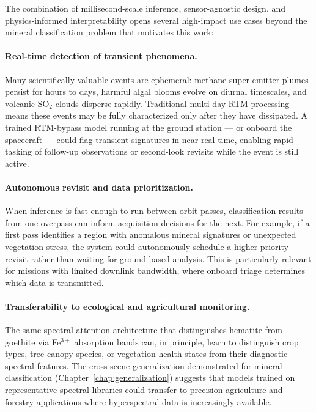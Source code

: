 \documentclass[11pt]{report}
\begin{document}
The combination of millisecond-scale inference, sensor-agnostic design, and physics-informed interpretability opens several high-impact use cases beyond the mineral classification problem that motivates this work:

\paragraph{Real-time detection of transient phenomena.}
Many scientifically valuable events are ephemeral: methane super-emitter plumes persist for hours to days, harmful algal blooms evolve on diurnal timescales, and volcanic SO$_2$ clouds disperse rapidly. Traditional multi-day RTM processing means these events may be fully characterized only after they have dissipated. A trained RTM-bypass model running at the ground station --- or onboard the spacecraft --- could flag transient signatures in near-real-time, enabling rapid tasking of follow-up observations or second-look revisits while the event is still active.

\paragraph{Autonomous revisit and data prioritization.}
When inference is fast enough to run between orbit passes, classification results from one overpass can inform acquisition decisions for the next. For example, if a first pass identifies a region with anomalous mineral signatures or unexpected vegetation stress, the system could autonomously schedule a higher-priority revisit rather than waiting for ground-based analysis. This is particularly relevant for missions with limited downlink bandwidth, where onboard triage determines which data is transmitted.

\paragraph{Transferability to ecological and agricultural monitoring.}
The same spectral attention architecture that distinguishes hematite from goethite via Fe$^{3+}$ absorption bands can, in principle, learn to distinguish crop types, tree canopy species, or vegetation health states from their diagnostic spectral features. The cross-scene generalization demonstrated for mineral classification (Chapter~\ref{chap:generalization}) suggests that models trained on representative spectral libraries could transfer to precision agriculture and forestry applications where hyperspectral data is increasingly available.
\end{document}
